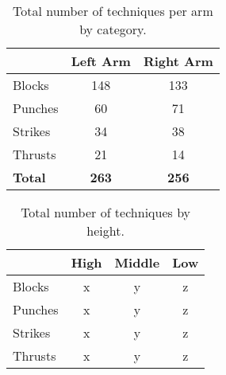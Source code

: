 \documentclass[10pt,twocolumn,a4paper]{article}
\begin{document}







\begin{table}
  \centering
  \begin{tabular}{l|c|c} \hline \hline
    & Left Arm & Right Arm \\ \hline

    Blocks    & 148   & 133 \\
    Punches   &  60   &  71 \\
    Strikes   &  34   &  38 \\
    Thrusts   &  21   &  14 \\
    \hline

    \textbf{Total}   & \textbf{263}   & \textbf{256} \\
    \hline
  \end{tabular}
  \caption{Total number of techniques per arm by category.}
  \end{table}


\begin{table}
  \centering
  \begin{tabular}{l|c|c|c} \hline \hline
    & High & Middle & Low \\ \hline

    Blocks    & x   & y   & z \\
    Punches   & x   & y   & z \\
    Strikes   & x   & y   & z \\
    Thrusts   & x   & y   & z \\
    \hline

  \end{tabular}
  \caption{Total number of techniques by height.}
  \end{table}
\end{document}
